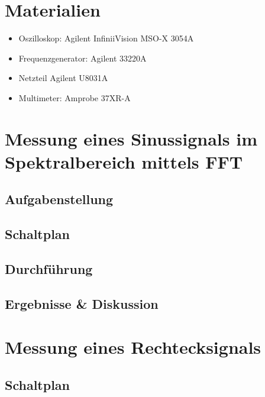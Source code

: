 \documentclass[12pt,a4paper,titlepage]{article}
\begin{document}
\setcounter{page}{2}

\newpage
\setcounter{tocdepth}{1}
\tableofcontents

\newpage

\section*{Materialien}
\begin{itemize}
	\item Oszilloskop: Agilent InfiniiVision MSO-X 3054A
	\item Frequenzgenerator: Agilent 33220A
  \item Netzteil Agilent U8031A
  \item Multimeter: Amprobe 37XR-A
\end{itemize}

\section{Messung eines Sinussignals im Spektralbereich mittels FFT}

\subsection*{Aufgabenstellung}

\subsection*{Schaltplan}

\subsection*{Durchf\"uhrung}

\subsection*{Ergebnisse \& Diskussion}


\section{Messung eines Rechtecksignals}

\subsection*{Schaltplan}
\end{document}
